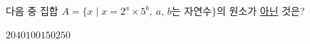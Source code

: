 다음 중 집합 $A=\{x \mid x=2^a\times 5^b,\ a,\,b$는 자연수$\}$의 원소가 \underline{아닌} 것은?
\begin{choices32}{$20$}{$40$}{$100$}{$150$}{$250$}\end{choices32}
